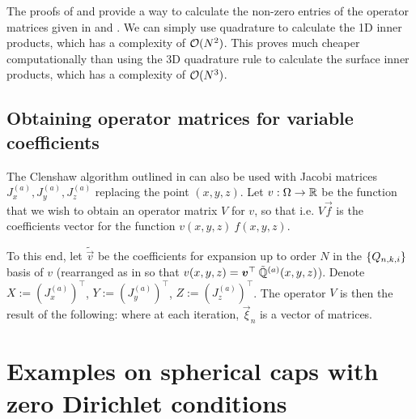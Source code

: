 The proofs of  and  provide a way to calculate the non-zero entries of the operator matrices given in  and . We can simply use quadrature to calculate the 1D inner products, which has a complexity of $\mathcal{O}(N^2)$. This proves much cheaper computationally than using the 3D quadrature rule to calculate the surface inner products, which has a complexity of $\mathcal{O}(N^3)$.


\subsection{Obtaining operator matrices for variable coefficients}\label{section:sc:operatorclenshaw}

The Clenshaw algorithm outlined in  can also be used with Jacobi matrices $J^{(a)}_x, J^{(a)}_y, J^{(a)}_z$ replacing the point $(x,y,z)$. Let $v : \Omega \to \mathbb{R}$ be the function that we wish to obtain an operator matrix $V$ for $v$, so that
i.e. $V \vec{f}$ is the coefficients vector for the function $v(x,y,z) \: f(x,y,z)$. 

To this end, let $\tilde{\vec{v}}$ be the coefficients for expansion up to order $N$ in the $\{Q_{n,k,i}\}$ basis of $v$ (rearranged as in  so that $v(x,y,z) = {\bm{v}}^\top \: \mathbb{\tilde{Q}}^{(a)}(x,y,z)$). Denote $X := (J_x^{(a)})^\top$, $Y := (J_y^{(a)})^\top$, $Z := (J_z^{(a)})^\top$. The operator $V$ is then the result of the following:
where at each iteration, $\vec{\xi}_n$ is a vector of matrices.



%
\section{Examples on spherical caps with zero Dirichlet conditions}\label{Section:sc:Examples}

